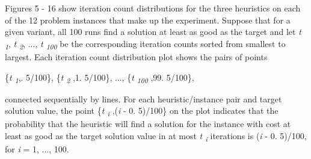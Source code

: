 \begin{multicols}{2}
\par{}Figures 5 -\allowbreak{} 16 show iteration count distributions for the three heuristics on each of the 12 problem instances that make up the experiment.\allowbreak{} Suppose that for a given variant,\allowbreak{} all 100 runs find a solution at least as good as the target and let \textit{t \textsubscript{1}},\allowbreak{} \textit{t \textsubscript{2}},\allowbreak{} .\allowbreak{}.\allowbreak{}.\allowbreak{},\allowbreak{} \textit{t \textsubscript{100}} be the corresponding iteration counts sorted from smallest to largest.\allowbreak{} Each iteration count distribution plot shows the pairs of points\par{}\{\allowbreak{}\allowbreak{}\textit{t \textsubscript{1}},\allowbreak{}.\allowbreak{} 5\fshyp{}100\}\allowbreak{},\allowbreak{} \{\allowbreak{}\allowbreak{}\textit{t \textsubscript{2}} ,\allowbreak{}1.\allowbreak{} 5\fshyp{}100\}\allowbreak{},\allowbreak{} .\allowbreak{}.\allowbreak{}.\allowbreak{},\allowbreak{} \{\allowbreak{}\allowbreak{}\textit{t \textsubscript{100}} ,\allowbreak{}99.\allowbreak{} 5\fshyp{}100\}\allowbreak{},\allowbreak{}\par{}connected sequentially by lines.\allowbreak{} For each heuristic\fshyp{}instance pair and target solution value,\allowbreak{} the point \{\allowbreak{}\allowbreak{}\textit{t \textsubscript{i}} ,\allowbreak{}(\allowbreak{}\textit{i} -\allowbreak{} 0.\allowbreak{} 5)\allowbreak{}\fshyp{}100\}\allowbreak{} on the plot indicates that the probability that the heuristic will find a solution for the instance with cost at least as good as the target solution value in at most \textit{t \textsubscript{i}} iterations is (\allowbreak{}\textit{i} -\allowbreak{} 0.\allowbreak{} 5)\allowbreak{}\fshyp{}100,\allowbreak{} for \textit{i} = 1,\allowbreak{} .\allowbreak{}.\allowbreak{}.\allowbreak{},\allowbreak{} 100.\allowbreak{}
\par
{
}
\par


\end{multicols}
